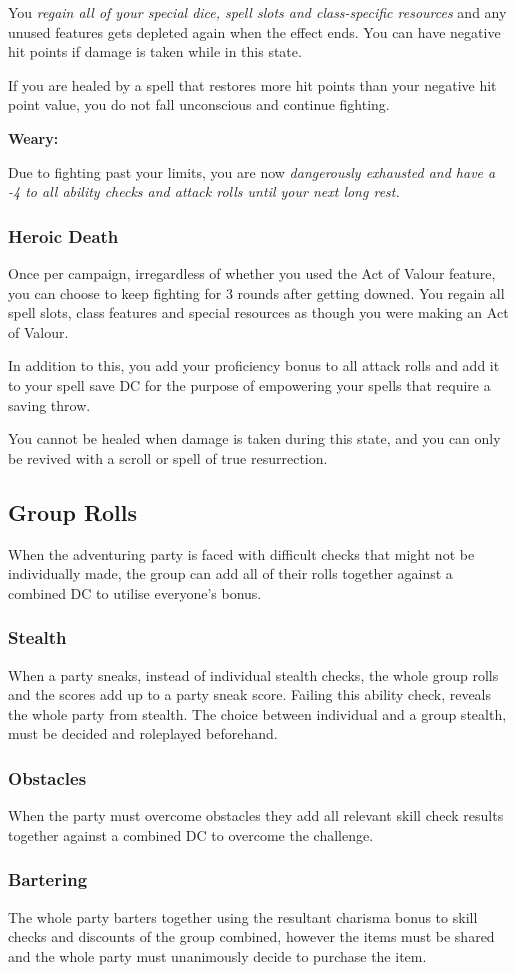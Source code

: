 You \textit{regain all of your special dice, spell slots and class-specific resources} and any unused features gets depleted again when the effect ends. You can have negative hit points if damage is taken while in this state.

If you are healed by a spell that restores more hit points than your negative hit point value, you do not fall unconscious and continue fighting.

\textbf{Weary:}

Due to fighting past your limits, you are now \textit{dangerously exhausted and have a -4 to all ability checks and attack rolls until your next long rest.}

\subsubsection{Heroic Death}
Once per campaign, irregardless of whether you used the Act of Valour feature, you can choose to keep fighting for 3 rounds after getting downed. You regain all spell slots, class features and special resources as though you were making an Act of Valour.

In addition to this, you add your proficiency bonus to all attack rolls and add it to your spell save DC for the purpose of empowering your spells that require a saving throw. 

You cannot be healed when damage is taken during this state, and you can only be revived with a scroll or spell of true resurrection. 


\subsection{Group Rolls}
When the adventuring party is faced with difficult checks that might not be individually made, the group can add all of their rolls together against a combined DC to utilise everyone's bonus.

\subsubsection{Stealth}
When a party sneaks, instead of individual stealth checks, the whole group rolls and the scores add up to a party sneak score. Failing this ability check, reveals the whole party from stealth. The choice between individual and a group stealth, must be decided and roleplayed beforehand.

\subsubsection{Obstacles}
When the party must overcome obstacles they add all relevant skill check results together against a combined DC to overcome the challenge.

\subsubsection{Bartering}
The whole party barters together using the resultant charisma bonus to skill checks and discounts of the group combined, however the items must be shared and the whole party must unanimously decide to purchase the item.

\begin{DndReadAloud}
    
\end{DndReadAloud}
